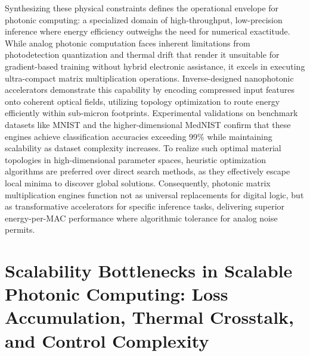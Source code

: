 \documentclass[11pt]{article}
\begin{document}
Synthesizing these physical constraints defines the operational envelope for photonic computing: a specialized domain of high-throughput, low-precision inference where energy efficiency outweighs the need for numerical exactitude. While analog photonic computation faces inherent limitations from photodetection quantization and thermal drift that render it unsuitable for gradient-based training without hybrid electronic assistance, it excels in executing ultra-compact matrix multiplication operations. Inverse-designed nanophotonic accelerators demonstrate this capability by encoding compressed input features onto coherent optical fields, utilizing topology optimization to route energy efficiently within sub-micron footprints. Experimental validations on benchmark datasets like MNIST and the higher-dimensional MedNIST confirm that these engines achieve classification accuracies exceeding 99\% while maintaining scalability as dataset complexity increases. To realize such optimal material topologies in high-dimensional parameter spaces, heuristic optimization algorithms are preferred over direct search methods, as they effectively escape local minima to discover global solutions. Consequently, photonic matrix multiplication engines function not as universal replacements for digital logic, but as transformative accelerators for specific inference tasks, delivering superior energy-per-MAC performance where algorithmic tolerance for analog noise permits. \citep{doi_10_1038_s41467_026_68648_1_26658a9c} \citep{s2_cea9e6112f363e19aa754d2681622ab07650c71c_7db5c737} \citep{doi_10_3390_nano14080697_c372a140} \citep{doi_10_1515_nanoph_2022_0423_38a2c3ec}

\section{Scalability Bottlenecks in Scalable Photonic Computing: Loss Accumulation, Thermal Crosstalk, and Control Complexity}\label{scalability-bottlenecks-in-scalable-photonic-computing-loss-accumulation-thermal-crosstalk-and-control-complexity}
\end{document}
